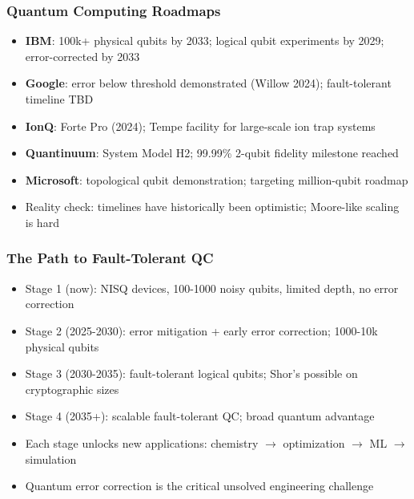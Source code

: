 \begin{frame}[fragile]\frametitle{Quantum Computing Roadmaps}
\begin{itemize}
\item \textbf{IBM}: 100k+ physical qubits by 2033; logical qubit experiments by 2029; error-corrected by 2033
\item \textbf{Google}: error below threshold demonstrated (Willow 2024); fault-tolerant timeline TBD
\item \textbf{IonQ}: Forte Pro (2024); Tempe facility for large-scale ion trap systems
\item \textbf{Quantinuum}: System Model H2; 99.99\% 2-qubit fidelity milestone reached
\item \textbf{Microsoft}: topological qubit demonstration; targeting million-qubit roadmap
\item Reality check: timelines have historically been optimistic; Moore-like scaling is hard
\end{itemize}
\end{frame}

\begin{frame}[fragile]\frametitle{The Path to Fault-Tolerant QC}
\begin{itemize}
\item Stage 1 (now): NISQ devices, 100-1000 noisy qubits, limited depth, no error correction
\item Stage 2 (2025-2030): error mitigation + early error correction; 1000-10k physical qubits
\item Stage 3 (2030-2035): fault-tolerant logical qubits; Shor's possible on cryptographic sizes
\item Stage 4 (2035+): scalable fault-tolerant QC; broad quantum advantage
\item Each stage unlocks new applications: chemistry $\to$ optimization $\to$ ML $\to$ simulation
\item Quantum error correction is the critical unsolved engineering challenge
\end{itemize}
\end{frame}

